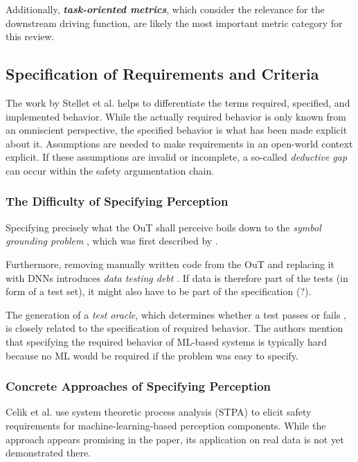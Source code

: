 \documentclass[conference]{IEEEtran}
\newcommand{\citeold}[1]{{\hypersetup{citecolor=black}\cite{#1}}}
\begin{document}
Additionally, \textit{\textbf{task-oriented metrics}}, which consider the relevance for the downstream driving function, are likely the most important metric category for this review. 

\subsection{Specification of Requirements and Criteria}
\label{sec:requirements}

The work by Stellet et al. \cite{Stellet2019formalization} helps to differentiate the terms required, specified, and implemented behavior.
While the actually required behavior is only known from an omniscient perspective, the specified behavior is what has been made explicit about it. 
Assumptions are needed to make requirements in an open-world context explicit. 
If these assumptions are invalid or incomplete, a so-called \textit{deductive gap} can occur within the safety argumentation chain. 


\subsubsection{The Difficulty of Specifying Perception}

Specifying precisely what the OuT shall perceive boils down to the \textit{symbol grounding problem} \citeold{Salay2019partialspecifications}, which was first described by \cite{Harnad1990symbolgrounding}.

Furthermore, removing manually written code from the OuT and replacing it with DNNs introduces \textit{data testing debt} \cite{Sculley2015debt}. 
If data is therefore part of the tests (in form of a test set), it might also have to be part of the specification (?).

The generation of a \textit{test oracle}, which determines whether a test passes or fails \cite{Abrecht2021testing}, is closely related to the specification of required behavior. 
The authors mention that specifying the required behavior of ML-based systems is typically hard because no ML would be required if the problem was easy to specify.


\subsubsection{Concrete Approaches of Specifying Perception} 

Celik et al. \cite{Celik2022stpa} use system theoretic process analysis (STPA) to elicit safety requirements for machine-learning-based perception components. While the approach appears promising in the paper, its application on real data is not yet demonstrated there. 
\end{document}
